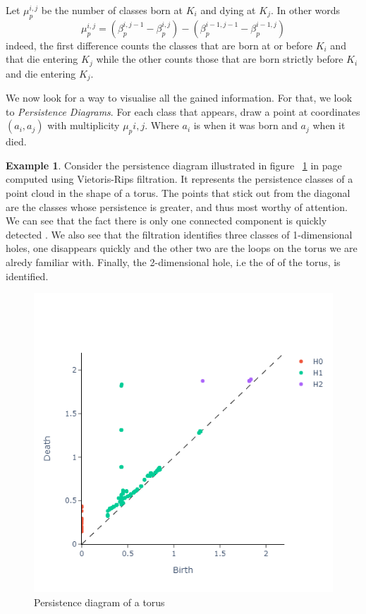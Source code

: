 \documentclass{article}
\theoremstyle{plain}
\theoremstyle{definition}
\newtheorem{example}{Example}[section]
\theoremstyle{remark}
\begin{document}
Let $\mu_p^{i,j}$ be the number of classes born at $K_i$ and dying at $K_j$. In other words 
\[ \mu_p^{i,j} = \left( \beta_p^{i,j-1} - \beta_p^{i,j} \right) - \left( \beta_p^{i-1,j-1} - \beta_p^{i-1,j}  \right) \]
indeed, the first difference counts the classes that are born at or before $K_i$ and that die entering $K_j$ while the other counts those that are born strictly before $K_i$ and die entering $K_j$.

We now look for a way to visualise all the gained information. For that, we look to \emph{Persistence Diagrams}. For each class that appears, draw a point at coordinates $(a_i,a_j)$ with multiplicity $\mu_p{i,j}$. Where $a_i$ is when it was born and $a_j$ when it died.

\begin{example}
Consider the persistence diagram illustrated in figure ~\ref{fig:torus-rips-persisntence} in page ~\pageref{fig:torus-rips-persisntence} computed using Vietoris-Rips filtration. It represents the persistence classes of a point cloud in the shape of a torus. The points that stick out from the diagonal are the classes whose persistence is greater, and thus most worthy of attention. We can see that the fact there is only one connected component is quickly detected . We also see that the filtration identifies three classes of 1-dimensional holes, one disappears quickly and the other two are the loops on the torus we are alredy familiar with. Finally, the 2-dimensional hole, i.e the  of of the torus, is identified.
\end{example}

\begin{figure}[ht]
    \centering
    \includegraphics[scale=.5]{torus-rips-persistence.png}
    \caption{Persistence diagram of a torus}
    \label{fig:torus-rips-persisntence}
\end{figure}
\end{document}
